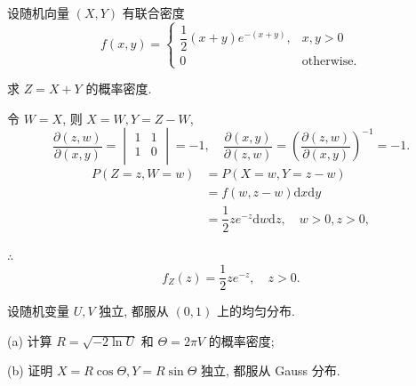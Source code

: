 \documentclass[color=black,device=normal,lang=cn]{elegantnote}
\numberwithin{equation}{section}
\theoremstyle{plain}
\numberwithin{exercise}{exsection}
\begin{document}
\begin{exercise}%
    设随机向量 $(X,Y)$ 有联合密度
    \[f(x,y)=\begin{cases}
        \dfrac{1}{2}(x+y)e^{-(x+y)}, & x,y>0 \\
        0 & \text{otherwise}.
    \end{cases}\]

    求 $Z=X+Y$ 的概率密度.
\end{exercise}
\begin{solution}
    令 $W=X$, 则 $X=W,Y=Z-W$,
    \[\dfrac{\partial(z,w)}{\partial(x,y)}=\begin{vmatrix}
        1 & 1 \\
        1 & 0 \\
    \end{vmatrix}=-1,\quad\dfrac{\partial(x,y)}{\partial(z,w)}=\left(\dfrac{\partial(z,w)}{\partial(x,y)}\right)^{-1}=-1.\]
    \begin{align*}
        P(Z=z,W=w) & =P(X=w,Y=z-w) \\
        & =f(w,z-w)\mathrm{d}x\mathrm{d}y \\
        & =\dfrac{1}{2}ze^{-z}\mathrm{d}w\mathrm{d}z,\quad w>0,z>0,
    \end{align*}

    $\therefore$
    \[f_Z(z)=\dfrac{1}{2}ze^{-z},\quad z>0.\]
\end{solution}
\addtocounter{exercise}{1}
\begin{exercise}%
    设随机变量 $U,V$ 独立, 都服从 $(0,1)$ 上的均匀分布.

    (a) 计算 $R=\sqrt{-2\ln U}$ 和 $\Theta=2\pi V$ 的概率密度;

    (b) 证明 $X=R\cos\Theta,Y=R\sin\Theta$ 独立, 都服从 Gauss 分布.
\end{exercise}
\end{document}
